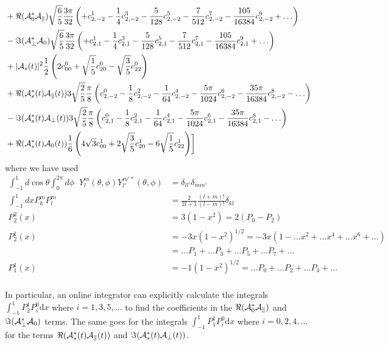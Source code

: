 \begin{align}
         &                   +\Re({\cal A}_0^*{\cal A}_\parallel)\sqrt{\frac{6}{5}}\frac{3\pi}{32}\left( +c^1_{2,-2}-\frac{1}{4}c^3_{2,-2}-\frac{5}{128}c^5_{2,-2}-\frac{7}{512}c^7_{2,-2} - \frac{105}{16384}c^9_{2,-2}+\ldots \right) \\
         &                   -\Im({\cal A}_\perp^* {\cal A}_0 )  \sqrt{\frac{6}{5}}\frac{3\pi}{32}\left( +c^1_{2,1} -\frac{1}{4}c^3_{2,1}- \frac{5}{128}c^5_{2,1} -\frac{7}{512}c^7_{2,1} - \frac{105}{16384}c^9_{2,1}+\ldots \right) \\
         &                  +|{\cal A}_{s}(t)|^2  \frac{1}{2} \left(2c^0_{00} + \sqrt{\frac{1}{5}}c^0_{20} -\sqrt{\frac{3}{5}} c^0_{22}\right) \\
         &                  +\Re({\cal A}_{s}^*(t){\cal A}_\parallel(t)) 3 \sqrt{\frac{2}{5}}\frac{\pi}{8} \left(c^0_{2,-2}-\frac{1}{8}c^2_{2,-2}-\frac{1}{64}c^4_{2,-2}-\frac{5\pi}{1024}c^6_{2,-2}-\frac{35\pi}{16384}c^8_{2,-2}-\ldots\right)\\
         &                  -\Im({\cal A}_{s}^*(t){\cal A}_\perp(t)) 3\sqrt{\frac{2}{5}} \frac{\pi}{8} \left(c^0_{2,1}-\frac{1}{8}c^2_{2,1}-\frac{1}{64}c^4_{2,1}-\frac{5\pi}{1024}c^6_{2,1}-\frac{35\pi}{16384}c^8_{2,1}-\ldots\right)\\
         &                  +\Re({\cal A}_{s}^*(t){\cal A}_0(t)) \frac{1}{6}\left(4\sqrt{3}  c^1_{00} + 2 \sqrt{\frac{3}{5}} c^1_{20} - 6 \sqrt{\frac{1}{5}}c^1_{22}\right)
      \biggr]
\end{align}
where we have used
\begin{align}
  \int_{-1}^1 d\cos\theta \int_0^{2\pi} d\phi \;\;Y_l^m(\theta,\phi) Y_{l'}^{m'*}(\theta,\phi)
    &= \delta_{ll'}\delta_{mm'}\\
  \int_{-1}^1 dx  P_k^m P_l^m &= \frac{2}{2l+1}\frac{(l+m)!}{(l-m)!}\delta_{kl} \\
  P_2^2(x) &= 3(1-x^2) = 2(P_0-P_2)\\
  P_2^1(x) &= -3x(1-x^2)^{1/2} = -3x(1-\ldots x^2 + \ldots x^4  + \ldots x^6 + \ldots) \\
    &= \ldots P_1 + \ldots P_3 + \ldots P_5 +\ldots P_7 + \ldots\\
  P_1^1(x) &= -1(1-x^2)^{1/2} = \ldots P_0 + \ldots P_2 + \ldots P_4 + \ldots\\
\end{align}

In particular, an online integrator can explicitly calculate the integrals
$\int_{-1}^{1}P_2^1P_i^0\mathrm{d}x$ where  $i = 1,3,5,\ldots$ to find the coefficients in the
$\Re({\cal A}_0^*{\cal A}_\parallel)$ and $\Im({\cal A}_\perp^* {\cal A}_0 )$ terms. The same goes
for the integrals $\int_{-1}^{1}P_1^1P_i^0\mathrm{d}x$ where $i=0,2,4,\ldots$ for the terms
$\Re({\cal A}_{s}^*(t){\cal A}_\parallel(t))$ and $\Im({\cal A}_{s}^*(t){\cal A}_\perp(t))$.

